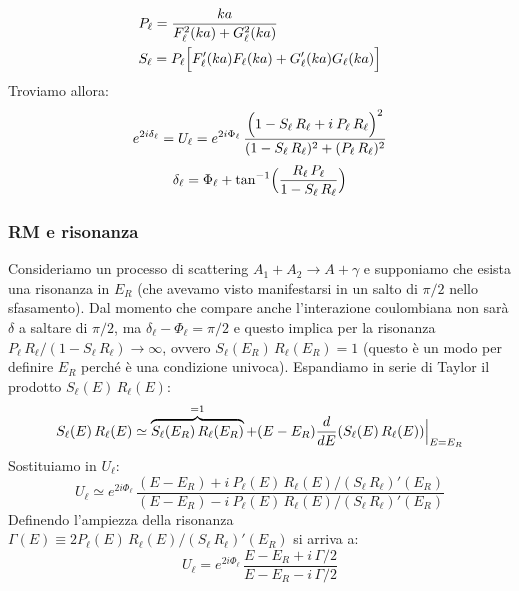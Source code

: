 \begin{displaymath}
	\begin{aligned}
	&P_\ell = \frac{ka}{F_\ell^2 (ka) + G_\ell^2 (ka)}\\ 
	&S_\ell = P_\ell \Bigl [ F_\ell ' (ka) F_\ell (ka) + G_\ell ' (ka)G_\ell (ka) \Bigr ]
	\end{aligned}
\end{displaymath}
Troviamo allora:
$$e^{2i\delta_\ell} = U_\ell = e^{2i\Phi_\ell} \, \frac{\Bigl ( 1-S_\ell\, R_\ell + i\: P_\ell\, R_\ell \Bigr )^2}{(1-S_\ell\, R_\ell)^2 + (P_\ell \, R_\ell)^2}$$
\begin{equation}\label{0412_delta}
\delta_\ell = \Phi_\ell + \tan^{-1} \Bigl ( \frac{R_\ell\, P_\ell}{1-S_\ell\, R_\ell} \Bigr ) 
\end{equation}

\subsubsection{RM e risonanza}
Consideriamo un processo di scattering $A_1 + A_2 \to A + \gamma$ e supponiamo che esista una risonanza in $E_R$ (che avevamo visto manifestarsi in un salto di $\pi/2$ nello sfasamento). Dal momento che compare anche l'interazione coulombiana non sarà $\delta$ a saltare di $\pi/2$, ma $\delta_\ell -\Phi_\ell = \pi/2$ e questo implica per la risonanza $P_\ell\, R_\ell / (1-S_\ell\, R_\ell) \to \infty$, ovvero $S_\ell (E_R)\, R_\ell(E_R) =1 $ (questo è un modo per definire $E_R$ perché è una condizione univoca). Espandiamo in serie di Taylor il prodotto $S_\ell(E)\, R_\ell(E)$:
$$S_\ell(E)\, R_\ell(E) \simeq \overbrace{S_\ell(E_R)\, R_\ell(E_R)}^{=1} + (E-E_R) \frac{d}{dE}(S_\ell(E)\, R_\ell(E))\Bigl |_{E=E_R}$$
Sostituiamo in $U_\ell$:
$$U_\ell \simeq e^{2i\Phi_\ell} \, \frac{(E-E_R)+i\: P_\ell (E)\, R_\ell (E) /(S_\ell\, R_\ell)' (E_R)}{(E-E_R)- i \: P_\ell (E)\, R_\ell(E) / (S_\ell\,R_\ell)' (E_R)}$$
Definendo l'ampiezza della risonanza $\Gamma (E) \equiv 2P_\ell (E) \, R_\ell (E) / (S_\ell \, R_\ell)' (E_R)$ si arriva a:
\begin{equation}\label{0412_risUl}
U_\ell = e^{2i\Phi_\ell} \, \frac{E-E_R + i\, \Gamma/2}{E-E_R - i\,\Gamma/2}
\end{equation}

